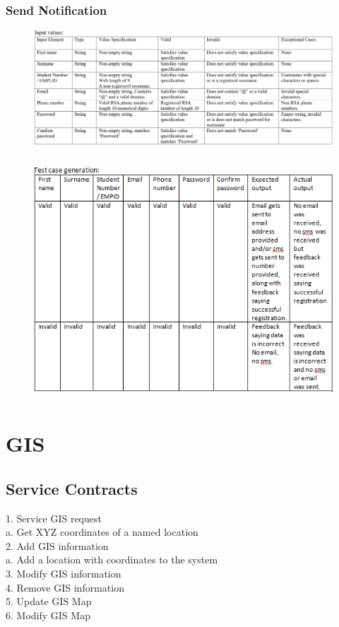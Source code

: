 \documentclass[english]{article}
\begin{document}
\subsubsection{Send Notification}
\begin{figure}[H]
    \label{tab:example}
\hspace*{-2.5cm}
\includegraphics[width=180mm]{5.png}
\end{figure}

\begin{figure}[H]
\hspace*{-2.5cm}
\includegraphics[width=180mm,height=90mm]{NotificationsTest.png}
\end{figure}
\section{GIS}
\subsection{Service Contracts}
1.	Service GIS request\\
	a.	Get XYZ coordinates of a named location\\
2.	Add GIS information\\
	a.	Add a location with coordinates to the system\\
3.	Modify GIS information\\
4.	Remove GIS information\\
5.	Update GIS Map\\
6.	Modify GIS Map\\
\end{document}
